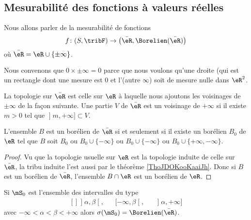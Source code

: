 \subsection{Mesurabilité des fonctions à valeurs réelles}

Nous allons parler de la mesurabilité de fonctions
\begin{equation}
    f\colon (S,\tribF)\to \big( \bar \eR,\Borelien(\bar \eR) \big)
\end{equation}
où \( \bar \eR=\eR\cup\{ \pm\infty \}\).

\begin{normaltext}      \label{normooGAAJooUPCbzG}
Nous convenons que \( 0\times\pm\infty=0\) parce que nous voulons qu'une droite (qui est un rectangle dont une mesure est \( 0\) et l'(autre \( \infty\)) soit de mesure nulle dans \( \eR^2\).
\end{normaltext}

\begin{definition}
La topologie sur \(\bar \eR\) est celle sur \( \eR\) à laquelle nous ajoutons les voisinages de \( \pm\infty\) de la façon suivante. Une partie \( V\) de \( \bar \eR\) est un voisinage de \( +\infty\) si il existe \( m>0\) tel que \( \mathopen] m , +\infty \mathclose]\subset V\).
\end{definition}

\begin{lemma}       \label{LEMooBLOLooAdNViv}
    L'ensemble \( B\) est un borélien de \( \bar \eR\) si et seulement si il existe un borélien \( B_0\) de \( \eR\) tel que \( B\) soit \( B_0\) ou \( B_0\cup\{ -\infty \}\) ou \( B_0\cup\{ -\infty \}\) ou \( B_0\cup\{ +\infty,-\infty \}\).
\end{lemma}

\begin{proof}
    Vu que la topologie usuelle sur \( \eR\) est la topologie induite de celle sur \( \bar \eR\), la tribu induite l'est aussi par le théorème \ref{ThoJDOKooKaaiJh}. Donc si \( B\) est un borélien de \( \bar \eR\), l'ensemble \( B\cap \eR\) est un borélien de \( \eR\).
\end{proof}

\begin{lemma}       \label{LemooCRVJooQosHPq}
    Si \( \mS_0\) est l'ensemble des intervalles du type 
    \begin{equation}
        \begin{aligned}[]
        \mathopen] \alpha , \beta \mathclose[,&&\mathopen[ -\infty , \beta \mathclose[,&&\mathopen] \alpha , +\infty \mathclose]
        \end{aligned}
    \end{equation}
    avec \( -\infty<\alpha<\beta<+\infty\) alors \( \sigma(\mS_0)=\Borelien(\bar\eR)\).
\end{lemma}


